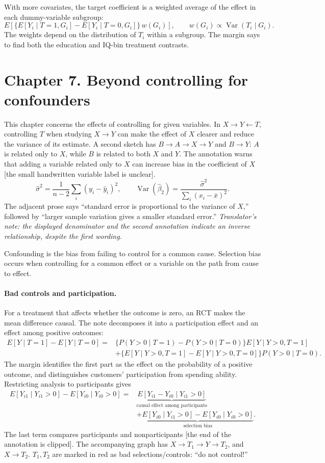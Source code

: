 With more covariates, the target coefficient is a weighted average of the effect in each dummy-variable subgroup:
\[E\!\left[\{E[Y_i\mid T=1,G_i]-E[Y_i\mid T=0,G_i]\}\,w(G_i)\right],\qquad
w(G_i)\propto\operatorname{Var}(T_i\mid G_i).
\]
The weights depend on the distribution of $T_i$ within a subgroup. The margin says to find both the education and IQ-bin treatment contrasts.

\section{Chapter 7. Beyond controlling for confounders}
This chapter concerns the effects of controlling for given variables. In $X\to Y\leftarrow T$, controlling $T$ when studying $X\to Y$ can make the effect of $X$ clearer and reduce the variance of its estimate. A second sketch has $B\to A\to X\to Y$ and $B\to Y$: $A$ is related only to $X$, while $B$ is related to both $X$ and $Y$. The annotation warns that adding a variable related only to $X$ can increase bias in the coefficient of $X$ [the small handwritten variable label is unclear].
\[\hat\sigma^2=\frac{1}{n-2}\sum_i(y_i-\hat y_i)^2,\qquad
\operatorname{Var}(\hat\beta_2)=\frac{\hat\sigma^2}{\sum_i(x_i-\bar x)^2}.\]
The adjacent prose says ``standard error is proportional to the variance of $X$,'' followed by ``larger sample variation gives a smaller standard error.'' \textit{Translator's note: the displayed denominator and the second annotation indicate an inverse relationship, despite the first wording.}

Confounding is the bias from failing to control for a common cause. Selection bias occurs when controlling for a common effect or a variable on the path from cause to effect.

\paragraph{Bad controls and participation.}
For a treatment that affects whether the outcome is zero, an RCT makes the mean difference causal. The note decomposes it into a participation effect and an effect among positive outcomes:
\begin{align*}
E[Y\mid T=1]-E[Y\mid T=0]
={}&\{P(Y>0\mid T=1)-P(Y>0\mid T=0)\}E[Y\mid Y>0,T=1]\\
&+\{E[Y\mid Y>0,T=1]-E[Y\mid Y>0,T=0]\}P(Y>0\mid T=0).
\end{align*}
The margin identifies the first part as the effect on the probability of a positive outcome, and distinguishes customers' participation from spending ability. Restricting analysis to participants gives
\begin{align*}
E[Y_{i1}\mid Y_{i1}>0]-E[Y_{i0}\mid Y_{i0}>0]
={}&\underbrace{E[Y_{i1}-Y_{i0}\mid Y_{i1}>0]}_{\text{causal effect among participants}}\\
&+\underbrace{E[Y_{i0}\mid Y_{i1}>0]-E[Y_{i0}\mid Y_{i0}>0]}_{\text{selection bias}}.
\end{align*}
The last term compares participants and nonparticipants [the end of the annotation is clipped]. The accompanying graph has $X\to T_1\to Y\to T_2$, and $X\to T_2$. $T_1,T_2$ are marked in red as bad selections/controls: ``do not control!''

